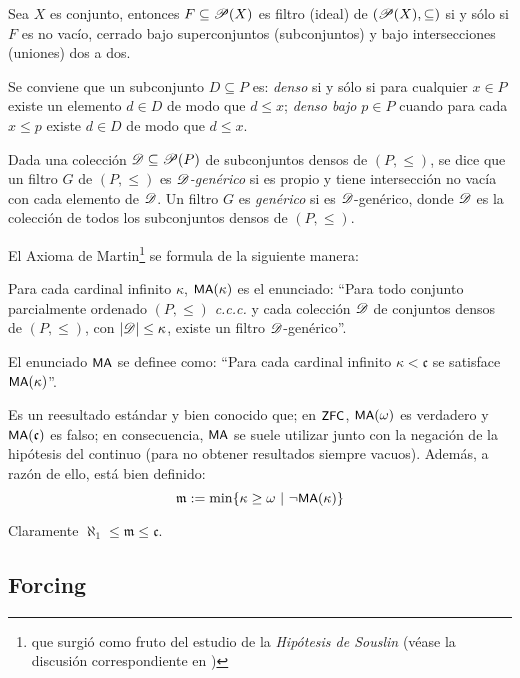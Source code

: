     \begin{observacion}\label{obs-filtr-potencia}
        Sea $X$ es conjunto, entonces $F \subseteq \mathscr{P}(X)$ es filtro (ideal) de $(\mathscr{P}(X),\subseteq)$ si y sólo si $F$ es no vacío, cerrado bajo superconjuntos (subconjuntos) y bajo intersecciones (uniones) dos a dos.
    \end{observacion}

    Se conviene que un subconjunto $D \subseteq P$ es: \textit{denso} si y sólo si para cualquier $x \in P$ existe un elemento $d \in D$ de modo que $d \leq x$; \textit{denso bajo $p \in P$} cuando para cada $x \leq p$ existe $d \in D$ de modo que $d \leq x$.

    Dada una colección $\mathscr{D} \subseteq \mathscr{P}(P)$ de subconjuntos densos de $(P,\leq)$, se dice que un filtro $G$ de $(P,\leq)$ es \textit{$\mathscr{D}$-genérico} si es propio y tiene intersección no vacía con cada elemento de $\mathscr{D}$. Un filtro $G$ es \textit{genérico} si es $\mathscr{D}$-genérico, donde $\mathscr{D}$ es la colección de todos los subconjuntos densos de $(P,\leq)$.

    El Axioma de Martin\footnote{que surgió como fruto del estudio de la \textit{Hipótesis de Souslin} (véase la discusión correspondiente en \cite{kunenSet})} se formula de la siguiente manera:
    \begin{definicion}\label{def-AxMartin}\index[sym]{$\Ma(\kappa)$}\index[sym]{$\Ma$}
        Para cada cardinal infinito $\kappa$, $\Ma(\kappa)$ es el enunciado: ``Para todo conjunto parcialmente ordenado $(P,\leq)$ \textit{c.c.c.} y cada colección $\mathscr{D}$ de conjuntos densos de $(P,\leq)$, con $|\mathscr{D}|\leq \kappa$, existe un filtro $\mathscr{D}$-genérico''.

        El enunciado $\Ma$ se definee como: ``Para cada cardinal infinito $\kappa<\mathfrak{c}$ se satisface $\Ma(\kappa)$''.
    \end{definicion}

    Es un reesultado estándar y bien conocido que; en $\text{\textsf{\small ZFC}}$, $\text{\textsf{\small MA}}(\omega)$ es verdadero y $\text{\textsf{\small MA}}(\mathfrak{c})$ es falso; en consecuencia, $\Ma$ se suele utilizar junto con la negación de la hipótesis del continuo (para no obtener resultados siempre vacuos). Además, a razón de ello, está bien definido:
    $$ \mathfrak{m}:=\min\{ \kappa \geq \omega \text{ $|$ } \lnot \text{\textsf{\small MA}}(\kappa) \} $$

    Claramente $\aleph_1 \leq \mathfrak{m} \leq \mathfrak{c}$.

    \subsection{Forcing}